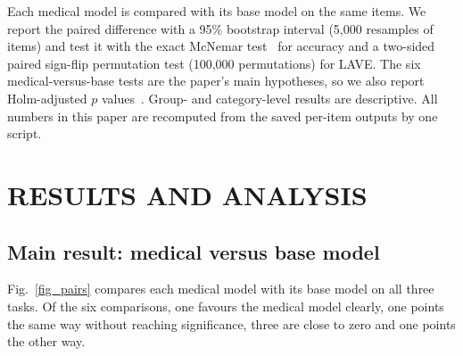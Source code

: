 \documentclass[doublecolumn]{ijcvsplatex}
\begin{document}
Each medical model is compared with its base model on the same items. We report the paired difference with a 95\% bootstrap interval (5,000 resamples of items) and test it with the exact McNemar test~\cite{mcnemar1947} for accuracy and a two-sided paired sign-flip permutation test (100,000 permutations) for LAVE. The six medical-versus-base tests are the paper's main hypotheses, so we also report Holm-adjusted $p$ values~\cite{holm1979}. Group- and category-level results are descriptive. All numbers in this paper are recomputed from the saved per-item outputs by one script.

\section{RESULTS AND ANALYSIS}
\label{sec_results}

\subsection{Main result: medical versus base model}
\label{sec_res_main}
Fig.~\ref{fig_pairs} compares each medical model with its base model on all three tasks. Of the six comparisons, one favours the medical model clearly, one points the same way without reaching significance, three are close to zero and one points the other way.
\end{document}
